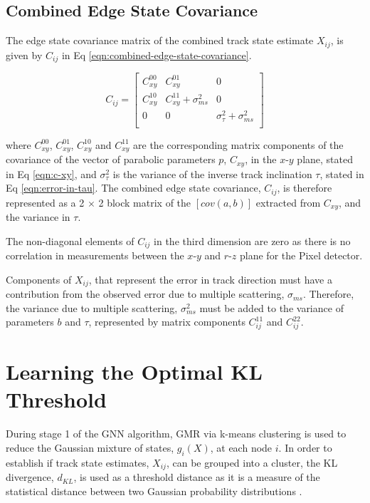 \subsection{Combined Edge State Covariance}

The edge state covariance matrix of the combined track state estimate $X_{ij}$, is given by $C_{ij}$ in Eq \eqref{eqn:combined-edge-state-covariance}.

\begin{equation}
    C_{ij} = \begin{bmatrix} 
            C_{xy}^{00} & C_{xy}^{01} & 0 \\ 
            C_{xy}^{10} & C_{xy}^{11} + \sigma_{ms}^2 & 0 \\ 
            0 & 0 & \sigma_{\tau}^{2} + \sigma_{ms}^2 \\
            \end{bmatrix} 
    \label{eqn:combined-edge-state-covariance}
\end{equation}

where $C_{xy}^{00}$, $C_{xy}^{01}$, $C_{xy}^{10}$ and $C_{xy}^{11}$ are the corresponding matrix components of the covariance of the vector of parabolic parameters $p$, $C_{xy}$, in the $x$-$y$ plane, stated in Eq \eqref{eqn:c-xy}, and $\sigma_{\tau}^2$ is the variance of the inverse track inclination $\tau$, stated in Eq \eqref{eqn:error-in-tau}. The combined edge state covariance, $C_{ij}$, is therefore represented as a 2 $\times$ 2 block matrix of the $[cov(a, b)]$ extracted from $C_{xy}$, and the variance in $\tau$.

The non-diagonal elements of $C_{ij}$ in the third dimension are zero as there is no correlation in measurements between the $x$-$y$ and $r$-$z$ plane for the Pixel detector.

Components of $X_{ij}$, that represent the error in track direction must have a contribution from the observed error due to multiple scattering, $\sigma_{ms}$. Therefore, the variance due to multiple scattering, $\sigma_{ms}^2$ must be added to the variance of parameters $b$ and $\tau$, represented by matrix components $C_{ij}^{11}$ and $C_{ij}^{22}$.




\section{Learning the Optimal KL Threshold}
\label{chapter-6-kl-threshold}

During stage 1 of the GNN algorithm, GMR via k-means clustering is used to reduce the Gaussian mixture of states, $g_i(X)$, at each node $i$. In order to establish if track state estimates, $X_{ij}$, can be grouped into a cluster, the KL divergence, $d_{KL}$, is used as a threshold distance as it is a measure of the statistical distance between two Gaussian probability distributions \cite{KL, FRUHWIRTH19971}.

